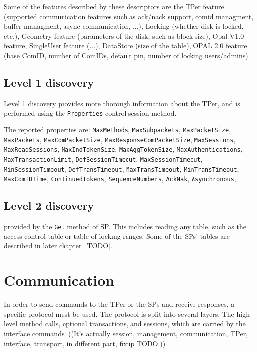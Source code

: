 Some of the features described by these descriptors are the TPer feature (supported communication features such as ack/nack support, comid managment, buffer managment, async communication, ...), Locking (whether disk is locked, etc.), Geometry feature (parameters of the disk, such as block size), Opal V1.0 feature, SingleUser feature (...), DataStore (size of the table), OPAL 2.0 feature (base ComID, number of ComIDs, default pin, number of locking users/admins).

\subsection{Level 1 discovery}

Level 1 discovery provides more thorough information about the TPer, and is performed using the \verb|Properties| control session method.

The reported properties are:
\verb|MaxMethods|, 
\verb|MaxSubpackets|, 
\verb|MaxPacketSize|, 
\verb|MaxPackets|,
\verb|MaxComPacketSize|,
\verb|MaxResponseComPacketSize|, 
\verb|MaxSessions|, 
\verb|MaxReadSessions|, 
\verb|MaxIndTokenSize|, 
\verb|MaxAggTokenSize|,
\verb|MaxAuthentications|, 
\verb|MaxTransactionLimit|, 
\verb|DefSessionTimeout|,  
\verb|MaxSessionTimeout|,
\verb|MinSessionTimeout|, 
\verb|DefTransTimeout|, 
\verb|MaxTransTimeout|,
\verb|MinTransTimeout|,
\verb|MaxComIDTime|,
\verb|ContinuedTokens|,
\verb|SequenceNumbers|, 
\verb|AckNak|, 
\verb|Asynchronous|, 


\subsection{Level 2 discovery}

provided by the \verb|Get| method of SP. This includes reading any table, such as the access control table or table of locking ranges. Some of the SPs' tables are described in later chapter~\ref{TODO}.


\section{Communication}

In order to send commands to the TPer or the SPs and receive responses, a specific protocol must be used. %
The protocol is split into several layers. The high level method calls, optional transactions, and sessions, which are carried by the interface commands.
((It's actually session, management, communication, TPer, interface, transport, in different part, fixup TODO.))


